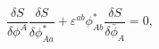 \begin{equation}
\frac{\delta S}{\delta\phi^{A}}\frac{\delta S}{\delta\phi_{Aa}^{\ast}}%
+\varepsilon^{ab}\phi_{Ab}^{\ast}\frac{\delta S}{\delta\bar{\phi}_{A}}=0,
\label{sp(2)_eq}
\end{equation}

